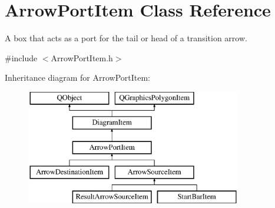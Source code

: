 \hypertarget{class_arrow_port_item}{\section{Arrow\-Port\-Item Class Reference}
\label{class_arrow_port_item}
}


A box that acts as a port for the tail or head of a transition arrow.  




{\ttfamily \#include $<$Arrow\-Port\-Item.\-h$>$}

Inheritance diagram for Arrow\-Port\-Item\-:\begin{figure}[H]
\begin{center}
\leavevmode
\includegraphics[height=5.000000cm]{class_arrow_port_item}
\end{center}
\end{figure}

